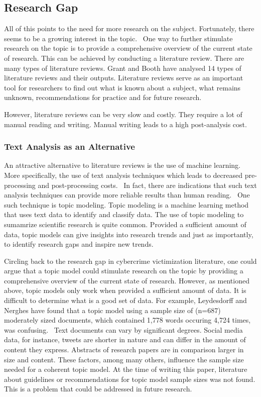 \subsection{Research Gap}

All of this points to the need for more research on the subject. Fortunately, there seems to be a growing interest in the topic.~\citep{horesearch} One way to further stimulate research on the topic is to provide a comprehensive overview of the current state of research. This can be achieved by conducting a literature review. There are many types of literature reviews. Grant and Booth have analysed 14 types of literature reviews and their outputs. Literature reviews serve as an important tool for researchers to find out what is known about a subject, what remains unknown, recommendations for practice and for future research.~\citep{grant2009typology}

However, literature reviews can be very slow and costly. They require a lot of manual reading and writing. Manual writing leads to a high post-analysis cost.~\citep{quinn2010analyze}

\subsubsection*{Text Analysis as an Alternative}

An attractive alternative to literature reviews is the use of machine learning. More specifically, the use of text analysis techniques which leads to decreased pre-processing and post-processing costs.~\citep{quinn2010analyze} In fact, there are indications that such text analysis techniques can provide more reliable results than human reading.~\citep{king2003automated}\citep{quinn2010analyze} One such technique is topic modeling. Topic modeling is a machine learning method that uses text data to identify and classify data. The use of topic modeling to sumamrize scientific research is quite common. Provided a sufficient amount of data, topic models can give insights into research trends and just as importantly, to identify research gaps and inspire new trends.~\citep{luiz2019trait}

Circling back to the research gap in cybercrime victimization literature, one could argue that a topic model could stimulate research on the topic by providing a comprehensive overview of the current state of research. However, as mentioned above, topic models only work when provided a sufficient amount of data. It is difficult to determine what is a good set of data. For example, Leydesdorff and Nerghes have found that a topic model using a sample size of (n=687) moderately sized documents, which contained 1,778 words occuring 4,724 times, was confusing.~\citep{leydesdorff2017co} Text documents can vary by significant degrees. Social media data, for instance, tweets are shorter in nature and can differ in the amount of content they express. Abstracts of research papers are in comparison larger in size and content. These factors, among many others, influence the sample size needed for a coherent topic model. At the time of writing this paper, literature about guidelines or recommendations for topic model sample sizes was not found. This is a problem that could be addressed in future research.

